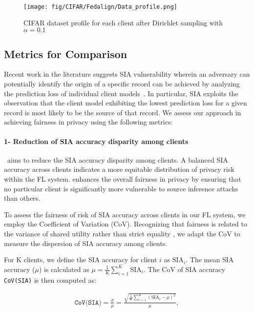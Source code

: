 \begin{figure*}
\centering
\texttt{[image: fig/CIFAR/Fedalign/Data\_profile.png]}
\caption{CIFAR dataset profile for each client after Dirichlet sampling with $\alpha=0.1$}
\label{fig:CIFAR data}
\end{figure*}



\subsection{Metrics for Comparison}\label{sec:metrics}
Recent work in the literature suggests SIA vulnerability wherein an adversary can potentially identify the origin of a specific record can be achieved by analyzing the prediction loss of individual client models~\cite{hu2023source}. In particular, SIA exploits the observation that the client model %
exhibiting the lowest prediction loss for a given record is most likely to be the source of that record. We assess our \sysname approach in achieving fairness in privacy using the following metrics:

 
\paragraph{\textbf{1- Reduction of SIA accuracy disparity among clients} } \sysname\  aims to reduce the SIA accuracy disparity among clients. A balanced SIA accuracy across clients indicates a more equitable distribution of privacy risk within the FL system. \sysname enhances the overall fairness in privacy by ensuring that no particular client is significantly more vulnerable to source inference attacks than others. 

To assess the fairness of risk of SIA accuracy across clients in our FL system, we employ the Coefficient of Variation (CoV). Recognizing that fairness is related to the variance of shared utility rather than strict equality \cite{jain1984quantitative}, we adapt the CoV to measure the dispersion of SIA accuracy among clients.

For K clients, we define the SIA accuracy for client $i$ as $\text{SIA}_i$. The mean SIA accuracy ($\mu$) is calculated as
$\mu = \frac{1}{K} \sum_{i=1}^{K} \text{SIA}_i$. The CoV of SIA accuracy \texttt{CoV(SIA)} is then computed as:

\begin{align}\label{eq:covsia}
\texttt{CoV(SIA)} = \frac{\sigma}{\mu} = \frac{\sqrt{\frac{1}{K} \sum_{i=1}^{K} (\text{SIA}_i - \mu)^2}}{\mu},
\end{align}

